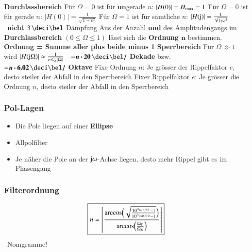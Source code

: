 \begin{outline}
    \1 \textbf{Durchlassbereich}
        \2 Für $\Omega = 0$ ist für \textbf{un}gerade $n$: $|H(0)| = H_{\rm max} = 1$
        \2 Für $\Omega = 0$ ist für gerade $n$: $|H(0)| = \frac{1}{\sqrt{1 + e^2}}$
        \2 Für $\Omega = 1$ ist für sämtliche $n$: $|H(\mathrm{j})| = \frac{1}{\sqrt{1 + e^2}}$ 
            \textrightarrow\ \textbf{nicht} $3 \, \deci \bel$ Dämpfung
        \2 Aus der Anzahl \textbf{ und } des Amplitudengangs im \textbf{Durchlassbereich} 
            $(0 \leq \Omega \leq 1)$ lässt sich die \textbf{Ordnung $\bm{n}$} bestimmen. \\
            \textbf{Ordnung = Summe aller  plus beide   minus 1}
    \1 \textbf{Sperrbereich}
        \2 Für $\Omega \gg 1$ wird $|H(\mathrm{j} \Omega)| \approx \frac{1}{e \cdot C_n(\Omega)}$ 
            \textrightarrow\ $\bm{- n \cdot 20 \, \deci \bel /}$ \textbf{Dekade} bzw.\\
            $\bm{- n \cdot 6.02 \, \deci \bel /}$ \textbf{Oktave}
        \2 Fixe Ordnung $n$: Je grösser der Rippelfaktor $e$, desto steiler der Abfall in den Sperrbereich
        \2 Fixer Rippelfaktor $e$: Je grösser die Ordnung $n$, desto steiler der Abfall in den Sperrbereich
\end{outline}


\begin{minipage}[t]{0.48\columnwidth}
    \subsubsection{Pol-Lagen}
    \begin{itemize}
        \item Die Pole liegen auf einer \textbf{Ellipse}
        \item Allpolfilter
        \item Je näher die Pole an der $\mathrm{j} \omega$-Achse liegen, desto mehr Rippel gibt es im Phasengang %
    \end{itemize}
\end{minipage}
\hfill
\begin{minipage}[t]{0.48\columnwidth}
    \subsubsection{Filterordnung}
    $$ \boxed{ n =  \left\lceil \frac{\arccos \Bigl( \sqrt{ \frac{10^{A_{\rm min / 10}} - 1}{10^{A_{\rm max / 10}} - 1} } \Bigr) }
        {\arccos \Bigl( \frac{\Omega_S}{\Omega_D} \Bigr)}  \right\rceil } $$
    \textrightarrow\ Nomgramme!
\end{minipage}


